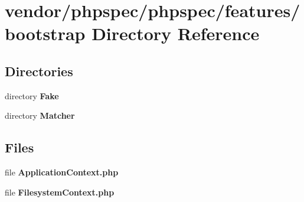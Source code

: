 \section{vendor/phpspec/phpspec/features/bootstrap Directory Reference}
\label{dir_e970644b6d214489ef1ec12c00e1e05b}
\subsection*{Directories}
\begin{DoxyCompactItemize}
\item 
directory {\bf Fake}
\item 
directory {\bf Matcher}
\end{DoxyCompactItemize}
\subsection*{Files}
\begin{DoxyCompactItemize}
\item 
file {\bf Application\+Context.\+php}
\item 
file {\bf Filesystem\+Context.\+php}
\end{DoxyCompactItemize}
